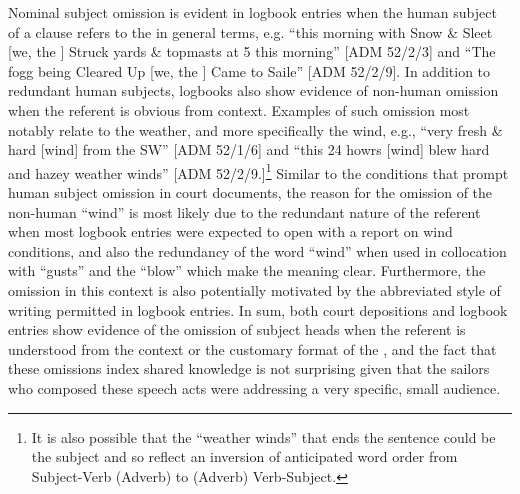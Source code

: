 Nominal subject omission is evident in logbook entries when the human subject of a clause refers to the  in general terms, e.g. “this morning with Snow \& Sleet [we, the ] Struck yards \& topmasts at 5 this morning” [ADM 52/2/3] and “The fogg being Cleared Up [we, the ] Came to Saile” [ADM 52/2/9]. In addition to redundant human subjects, logbooks also show evidence of non-human  omission when the referent is obvious from context. Examples of such omission most notably relate to the weather, and more specifically the wind, e.g., “very fresh \& hard [wind] from the SW” [ADM 52/1/6] and “this 24 howrs [wind] blew hard and hazey weather winds” [ADM 52/2/9.]\footnote{It is also possible that the  “weather winds” that ends the sentence could be the subject and so reflect an inversion of anticipated word order from Subject-Verb (Adverb) to (Adverb) Verb-Subject.}  Similar to the conditions that prompt human subject omission in court documents, the reason for the omission of the non-human  “wind” is most likely due to the redundant nature of the referent when most logbook entries were expected to open with a report on wind conditions, and also the redundancy of the word “wind” when used in collocation with “gusts” and the  “blow” which make the meaning clear. Furthermore, the omission in this context is also potentially motivated by the abbreviated style of writing permitted in logbook entries. In sum, both court depositions and logbook entries show evidence of the omission of  subject heads when the referent is understood from the context or the customary format of the , and the fact that these omissions index shared knowledge is not surprising given that the sailors who composed these speech acts were addressing a very specific, small audience.

